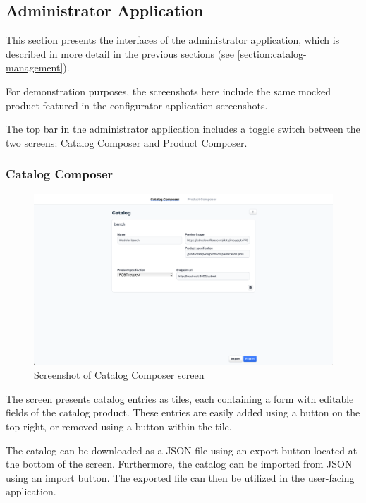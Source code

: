 \subsection{Administrator Application}

This section presents the interfaces of the administrator application, which is described in more detail in the previous sections (see \autoref{section:catalog-management}).

For demonstration purposes, the screenshots here include the same mocked product featured in the configurator application screenshots.

The top bar in the administrator application includes a toggle switch between the two screens: Catalog Composer and Product Composer.


\subsubsection{Catalog Composer}

\begin{figure}[h!]
\centering
\includegraphics[width=\textwidth]{images/screenshot_catalogcomposer.png}
\caption{Screenshot of Catalog Composer screen}
\label{fig:screenshot-catalogcomposer}
\end{figure}


The screen presents catalog entries as tiles, each containing a form with editable fields of the catalog product. These entries are easily added using a button on the top right, or removed using a button within the tile.

The catalog can be downloaded as a JSON file using an export button located at the bottom of the screen. Furthermore, the catalog can be imported from JSON using an import button. The exported file can then be utilized in the user-facing application.


